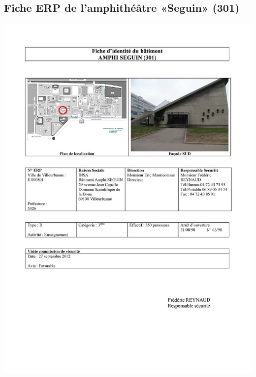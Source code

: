 \documentclass[hidelinks, paper=a4, fontsize=13pt]{report}
\begin{document}
\subsection{Fiche ERP de l’amphithéâtre «Seguin» (301)}
\begin{center}
\includegraphics[scale=0.5]{Annexes/Documents/ERPSeguin}
\end{center}
\end{document}
